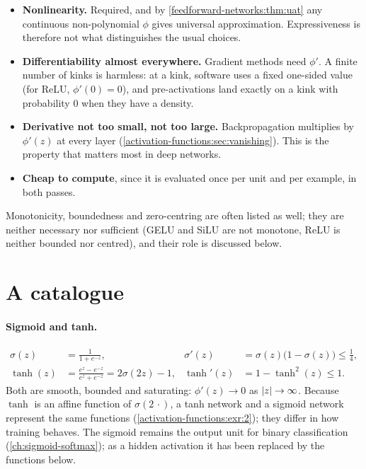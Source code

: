 \begin{notechapter}
\begin{itemize}
  \item \textbf{Nonlinearity.} Required, and by \cref{feedforward-networks:thm:uat} any
        continuous non-polynomial $\phi$ gives universal approximation. Expressiveness is therefore
        not what distinguishes the usual choices.
  \item \textbf{Differentiability almost everywhere.} Gradient methods need $\phi'$. A finite
        number of kinks is harmless: at a kink, software uses a fixed one-sided value (for
        ReLU, $\phi'(0) = 0$), and pre-activations land exactly on a kink with probability $0$
        when they have a density.
  \item \textbf{Derivative not too small, not too large.} Backpropagation multiplies by $\phi'(z)$
        at every layer (\cref{activation-functions:sec:vanishing}). This is the property
        that matters most in deep networks.
  \item \textbf{Cheap to compute}, since it is evaluated once per unit and per example, in
        both passes.
\end{itemize}
Monotonicity, boundedness and zero-centring are often listed as well; they are neither
necessary nor sufficient (GELU and SiLU are not monotone, ReLU is neither bounded nor
centred), and their role is discussed below.

\section{A catalogue}\label{activation-functions:sec:catalogue}

\paragraph{Sigmoid and tanh.}
\begin{align*}
  \sigma(z) &= \frac1{1 + e^{-z}}, & \sigma'(z) &= \sigma(z)\bigl(1 - \sigma(z)\bigr)\leq\tfrac14,\\
  \tanh(z) &= \frac{e^z - e^{-z}}{e^z + e^{-z}} = 2\sigma(2z) - 1, & \tanh'(z) &= 1 - \tanh^2(z)\leq1 .
\end{align*}
Both are smooth, bounded and saturating: $\phi'(z)\to0$ as $\left|z\right|\to\infty$. Because $\tanh$ is an
affine function of $\sigma(2\,\cdot)$, a tanh network and a sigmoid network represent the same functions
(\cref{activation-functions:exr:2}); they differ in how training behaves. The sigmoid
remains the output unit for binary classification (\cref{ch:sigmoid-softmax}); as a hidden
activation it has been replaced by the functions below.


\end{notechapter}
